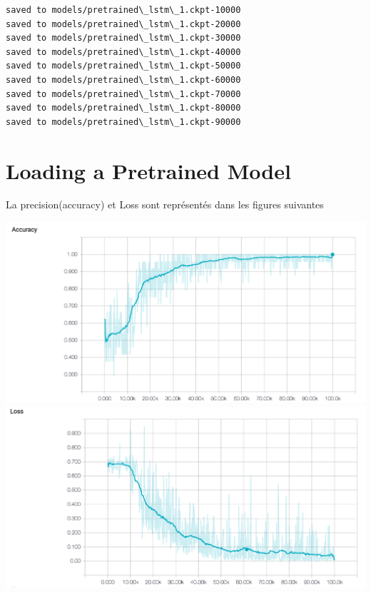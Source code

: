 \documentclass[11pt]{article}
\makeatletter
\def\maxwidth{\ifdim\Gin@nat@width>\linewidth\linewidth
    \else\Gin@nat@width\fi}
\let\Oldincludegraphics\includegraphics
\renewcommand{\includegraphics}[1]{\Oldincludegraphics[width=.8\maxwidth]{#1}}
\makeatother
\begin{document}
    \begin{Verbatim}[commandchars=\\\{\}]
saved to models/pretrained\_lstm\_1.ckpt-10000
saved to models/pretrained\_lstm\_1.ckpt-20000
saved to models/pretrained\_lstm\_1.ckpt-30000
saved to models/pretrained\_lstm\_1.ckpt-40000
saved to models/pretrained\_lstm\_1.ckpt-50000
saved to models/pretrained\_lstm\_1.ckpt-60000
saved to models/pretrained\_lstm\_1.ckpt-70000
saved to models/pretrained\_lstm\_1.ckpt-80000
saved to models/pretrained\_lstm\_1.ckpt-90000

    \end{Verbatim}

    \section{Loading a Pretrained Model}\label{loading-a-pretrained-model}

    La precision(accuracy) et Loss sont représentés dans les figures
suivantes

    \includegraphics{Images/SentimentAnalysis6.png}
\includegraphics{Images/SentimentAnalysis7.png}
\end{document}
